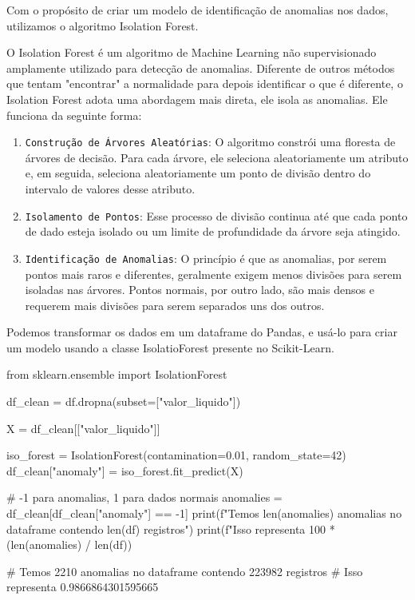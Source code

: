 \documentclass[12pt, a4paper]{article}
\begin{document}
Com o propósito de criar um modelo de identificação de anomalias nos dados, utilizamos o algoritmo Isolation Forest\cite{Scikit-Learn}.

O Isolation Forest é um algoritmo de Machine Learning não supervisionado amplamente utilizado para detecção de anomalias. Diferente de outros métodos que tentam "encontrar" a normalidade para depois identificar o que é diferente, o Isolation Forest adota uma abordagem mais direta, ele isola as anomalias. Ele funciona da seguinte forma\cite{isolation-forest}:

\begin{enumerate}
	\item \texttt{Construção de Árvores Aleatórias}: O algoritmo constrói uma floresta de árvores de decisão. Para cada árvore, ele seleciona aleatoriamente um atributo e, em seguida, seleciona aleatoriamente um ponto de divisão dentro do intervalo de valores desse atributo.
	\item \texttt{Isolamento de Pontos}: Esse processo de divisão continua até que cada ponto de dado esteja isolado ou um limite de profundidade da árvore seja atingido.
	\item \texttt{Identificação de Anomalias}: O princípio é que as anomalias, por serem pontos mais raros e diferentes, geralmente exigem menos divisões para serem isoladas nas árvores. Pontos normais, por outro lado, são mais densos e requerem mais divisões para serem separados uns dos outros.
\end{enumerate}

Podemos transformar os dados em um dataframe do Pandas\cite{Pandas}, e usá-lo para criar um modelo usando a classe IsolatioForest presente no Scikit-Learn\cite{Scikit-Learn}.

\begin{python}
from sklearn.ensemble import IsolationForest	

df_clean = df.dropna(subset=["valor_liquido"])

X = df_clean[["valor_liquido"]]

iso_forest = IsolationForest(contamination=0.01, random_state=42)
df_clean["anomaly"] = iso_forest.fit_predict(X)

# -1 para anomalias, 1 para dados normais
anomalies = df_clean[df_clean["anomaly"] == -1]
print(f"Temos {len(anomalies)} anomalias no dataframe contendo {len(df)} registros")
print(f"Isso representa {100 * (len(anomalies) / len(df))}%

# Temos 2210 anomalias no dataframe contendo 223982 registros
# Isso representa 0.9866864301595665%
\end{python}
\end{document}
